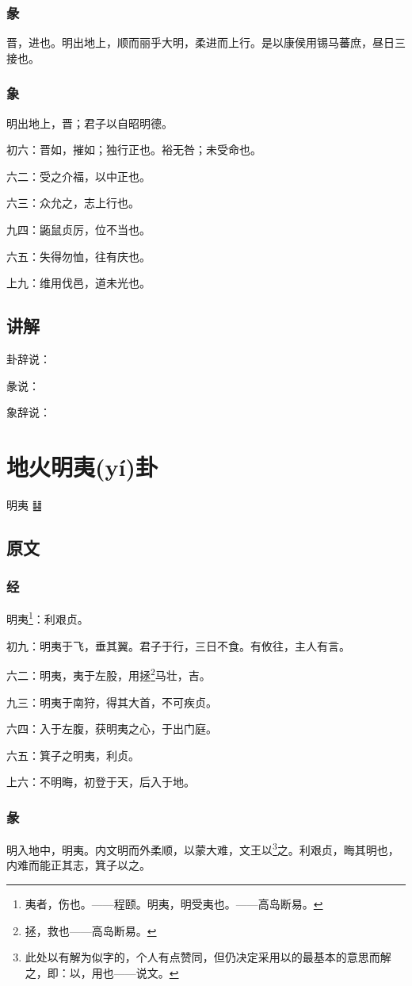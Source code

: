 \documentclass[12pt,oneside]{book}
\begin{document}
\subsection{彖}
晋，进也。明出地上，顺而丽乎大明，柔进而上行。是以康侯用锡马蕃庶，昼日三接也。

\subsection{象}
明出地上，晋；君子以自昭明德。

初六：晋如，摧如；独行正也。裕无咎；未受命也。

六二：受之介福，以中正也。

六三：众允之，志上行也。

九四：鼫鼠贞厉，位不当也。

六五：失得勿恤，往有庆也。

上九：维用伐邑，道未光也。

\section{讲解}
卦辞说：

彖说：

象辞说：

\chapter{地火明夷(yí)卦}
明夷 {\Large ䷣}

\section{原文}

\subsection{经}
明夷\footnote{夷者，伤也。——程颐。明夷，明受夷也。——高岛断易。}：利艰贞。

初九：明夷于飞，垂其翼。君子于行，三日不食。有攸往，主人有言。

六二：明夷，夷于左股，用拯\footnote{拯，救也——高岛断易。}马壮，吉。

九三：明夷于南狩，得其大首，不可疾贞。

六四：入于左腹，获明夷之心，于出门庭。

六五：箕子之明夷，利贞。

上六：不明晦，初登于天，后入于地。

\subsection{彖}
明入地中，明夷。内文明而外柔顺，以蒙大难，文王以\footnote{此处以有解为似字的，个人有点赞同，但仍决定采用以的最基本的意思而解之，即：以，用也——说文。}之。利艰贞，晦其明也，内难而能正其志，箕子以之。
\end{document}
